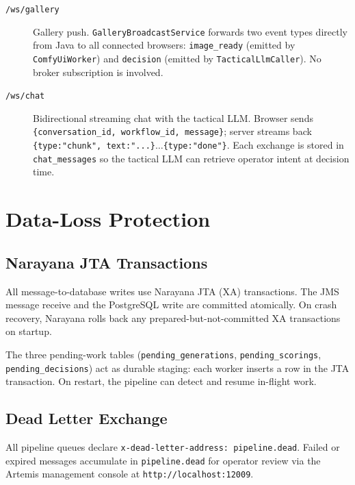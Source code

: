 \documentclass[11pt,letterpaper]{article}
\begin{document}
\begin{description}
  \item[\texttt{/ws/gallery}] Gallery push. \texttt{GalleryBroadcastService}
        forwards two event types directly from Java to all connected browsers:
        \texttt{image\_ready} (emitted by \texttt{ComfyUiWorker}) and
        \texttt{decision} (emitted by \texttt{TacticalLlmCaller}). No broker
        subscription is involved.
  \item[\texttt{/ws/chat}] Bidirectional streaming chat with the tactical LLM.
        Browser sends \texttt{\{conversation\_id, workflow\_id, message\}};
        server streams back \texttt{\{type:"chunk", text:"...\}$\ldots$\{type:"done"\}}.
        Each exchange is stored in \texttt{chat\_messages} so the tactical LLM
        can retrieve operator intent at decision time.
\end{description}

\section{Data-Loss Protection}

\subsection{Narayana JTA Transactions}

All message-to-database writes use Narayana JTA (XA) transactions. The JMS
message receive and the PostgreSQL write are committed atomically. On crash
recovery, Narayana rolls back any prepared-but-not-committed XA transactions
on startup.

The three pending-work tables (\texttt{pending\_generations},
\texttt{pending\_scorings}, \texttt{pending\_decisions}) act as durable
staging: each worker inserts a row in the JTA transaction. On restart, the
pipeline can detect and resume in-flight work.

\subsection{Dead Letter Exchange}

All pipeline queues declare \texttt{x-dead-letter-address: pipeline.dead}.
Failed or expired messages accumulate in \texttt{pipeline.dead} for operator
review via the Artemis management console at \texttt{http://localhost:12009}.
\end{document}
